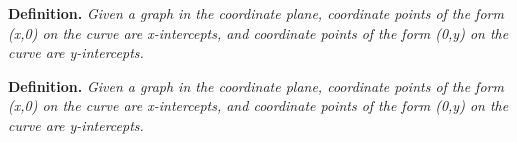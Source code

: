\documentclass{article}
\begin{document}
\begin{tcolorbox}[
    width=\linewidth,
    colframe=black,         %
    colback=white,          %
    boxrule=0.5pt,          %
    left=1mm, right=1mm,    %
    top=1mm, bottom=1mm,    %
    arc=2mm                 %
]
\textbf{Definition.} \textit{Given a graph in the coordinate plane, coordinate points of the form (x,0) on the curve are x-intercepts, and coordinate points of the form (0,y) on the curve are y-intercepts.}
\end{tcolorbox}


\vspace{1cm}

\begin{tcolorbox}[
    width=10cm,           %
    height=4cm,           %
    colframe=black,
    colback=white,
    boxrule=0.5pt,
    left=1mm, right=1mm,
    top=1mm, bottom=1mm,
    arc=2mm
]
\textbf{Definition.} \textit{Given a graph in the coordinate plane, coordinate points of the form (x,0) on the curve are x-intercepts, and coordinate points of the form (0,y) on the curve are y-intercepts.}
\end{tcolorbox}
\end{document}
